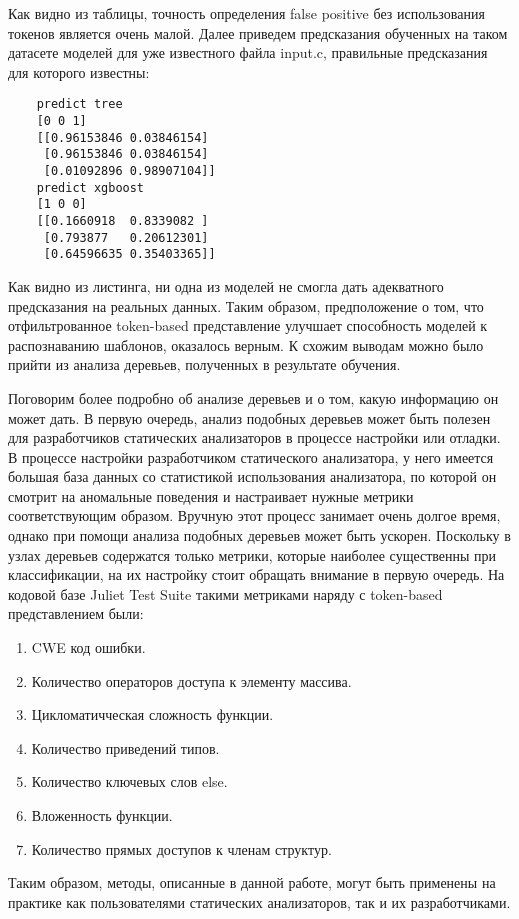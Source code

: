Как видно из таблицы, точность определения false positive без использования токенов является очень малой. Далее приведем предсказания обученных на таком датасете моделей для уже известного файла input.c, правильные предсказания для которого известны:

\begin{verbatim}
    predict tree
    [0 0 1]
    [[0.96153846 0.03846154]
     [0.96153846 0.03846154]
     [0.01092896 0.98907104]]
    predict xgboost
    [1 0 0]
    [[0.1660918  0.8339082 ]
     [0.793877   0.20612301]
     [0.64596635 0.35403365]]
\end{verbatim}

Как видно из листинга, ни одна из моделей не смогла дать адекватного предсказания на реальных данных. Таким образом, предположение о том, что отфильтрованное token-based представление улучшает способность моделей к распознаванию шаблонов, оказалось верным. К схожим выводам можно было прийти из анализа деревьев, полученных в результате обучения.

Поговорим более подробно об анализе деревьев и о том, какую информацию он может дать. В первую очередь, анализ подобных деревьев может быть полезен для разработчиков статических анализаторов в процессе настройки или отладки. В процессе настройки разработчиком статического анализатора, у него имеется большая база данных со статистикой использования анализатора, по которой он смотрит на аномальные поведения и настраивает нужные метрики соответствующим образом. Вручную этот процесс занимает очень долгое время, однако при помощи анализа подобных деревьев может быть ускорен. Поскольку в узлах деревьев содержатся только метрики, которые наиболее существенны при классификации, на их настройку стоит обращать внимание в первую очередь. На кодовой базе Juliet Test Suite такими метриками наряду с token-based представлением были:

\begin{enumerate}
    \item CWE код ошибки.
    \item Количество операторов доступа к элементу массива.
    \item Цикломатичческая сложность функции.
    \item Количество приведений типов.
    \item Количество ключевых слов else.
    \item Вложенность функции.
    \item Количество прямых доступов к членам структур.
\end{enumerate}

Таким образом, методы, описанные в данной работе, могут быть применены на практике как пользователями статических анализаторов, так и их разработчиками.

\newpage